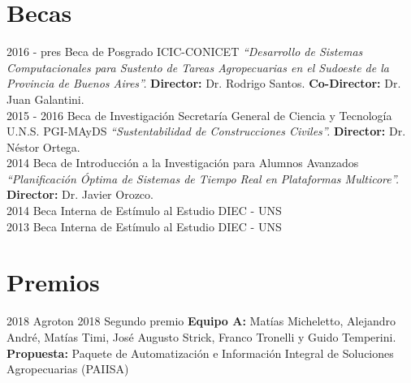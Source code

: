 \documentclass[letterpaper]{twentysecondcv} %
\begin{document}
\vspace{2mm}

\section{Becas}
\begin{twenty}
    \twentyitem
        {2016 - pres}
        {}
        {Beca de Posgrado}
        {ICIC-CONICET}
        {\textit{``Desarrollo de Sistemas Computacionales para Sustento de Tareas Agropecuarias en el Sudoeste de la Provincia de Buenos Aires''.}}
        {\textbf{Director:} Dr. Rodrigo Santos. \textbf{Co-Director:} Dr. Juan Galantini.} \\
    \twentyitem
        {2015 - 2016}
        {}
        {Beca de Investigación}
        {Secretaría General de Ciencia y Tecnología U.N.S.}
        {PGI-MAyDS \textit{``Sustentabilidad de Construcciones Civiles''.}}
        {\textbf{Director:} Dr. Néstor Ortega.} \\
    \twentyitem
        {2014}
        {}
        {Beca de Introducción a la Investigación para Alumnos Avanzados}
        {}
        {\textit{``Planificación Óptima de Sistemas de Tiempo Real en Plataformas Multicore''.}}
        {\textbf{Director:} Dr. Javier Orozco.} \\
    \twentyitem
        {2014}
        {}
        {Beca Interna de Estímulo al Estudio}
        {DIEC - UNS}
        {}
        {} \\
    \twentyitem
        {2013}
        {}
        {Beca Interna de Estímulo al Estudio}
        {DIEC - UNS}
        {}
        {}
\end{twenty}

\section{Premios}
\begin{twenty}
    \twentyitem
        {2018}
        {}
        {Agroton 2018}
        {Segundo premio}
        {\textbf{Equipo A:} Matías Micheletto, Alejandro André, Matías Timi, José Augusto Strick, Franco Tronelli y Guido Temperini.}
        {\textbf{Propuesta:} Paquete de Automatización e Información Integral de Soluciones Agropecuarias (PAIISA)}
\end{twenty}



\end{document}
